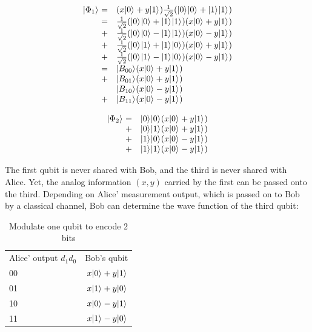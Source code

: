 \documentclass{ctexbook}
\begin{document}
\begin{equation}
\begin{array}{rl}
\vert {\Phi_1} \rangle_{}
    = & (x \vert {0} \rangle_{} + y\vert {1} \rangle_{}) \frac 1 {\sqrt 2}(\vert {0} \rangle_{}\vert {0} \rangle_{}+\vert {1} \rangle_{}\vert {1} \rangle_{}) \\
    = & \frac 1 {\sqrt 2} (\vert {0} \rangle_{}\vert {0} \rangle_{}+\vert {1} \rangle_{}\vert {1} \rangle_{}) (x \vert {0} \rangle_{} + y\vert {1} \rangle_{}) \\
    +& \frac 1 {\sqrt 2} (\vert {0} \rangle_{}\vert {0} \rangle_{}-\vert {1} \rangle_{}\vert {1} \rangle_{}) (x \vert {0} \rangle_{} - y\vert {1} \rangle_{})  \\
    +& \frac 1 {\sqrt 2} (\vert {0} \rangle_{}\vert {1} \rangle_{}+\vert {1} \rangle_{}\vert {0} \rangle_{}) (x \vert {0} \rangle_{} + y\vert {1} \rangle_{}) \\
    +& \frac 1 {\sqrt 2} (\vert {0} \rangle_{}\vert {1} \rangle_{}-\vert {1} \rangle_{}\vert {0} \rangle_{}) (x \vert {0} \rangle_{} - y\vert {1} \rangle_{}) \\
    = & \vert {B_{00}} \rangle_{} (x \vert {0} \rangle_{} + y\vert {1} \rangle_{}) \\
    +& \vert {B_{01}} \rangle_{} (x \vert {0} \rangle_{} + y\vert {1} \rangle_{}) \\
    & \vert {B_{10}} \rangle_{} (x \vert {0} \rangle_{} - y\vert {1} \rangle_{}) \\
    +& \vert {B_{11}} \rangle_{} (x \vert {0} \rangle_{} - y\vert {1} \rangle_{})
\end{array}
\end{equation}

\begin{equation}
\begin{array}{rl}
\vert {\Phi_2} \rangle_{}
    = & \vert {0} \rangle_{} \vert {0} \rangle_{} (x \vert {0} \rangle_{} + y\vert {1} \rangle_{}) \\
    +& \vert {0} \rangle_{} \vert {1} \rangle_{} (x \vert {0} \rangle_{} + y\vert {1} \rangle_{}) \\
    + & \vert {1} \rangle_{} \vert {0} \rangle_{}  (x \vert {0} \rangle_{} - y\vert {1} \rangle_{}) \\
    +& \vert {1} \rangle_{} \vert {1} \rangle_{} (x \vert {0} \rangle_{} - y\vert {1} \rangle_{})
\end{array}
\end{equation}

The first qubit is never shared with Bob, and the third is never shared with Alice. Yet, the analog information $(x, y)$ carried by the first can be passed onto the third. Depending on Alice' measurement output, which is passed on to Bob by a classical channel, Bob can determine the wave function of the third qubit:
\begin{table}[]
\label{TeleportationTable}
\begin{tabular}{lr}
Alice' output $d_1 d_0$ & Bob's qubit  \\
00 & $x\vert {0} \rangle_{}+y\vert {1} \rangle_{}$ \\
01 & $x\vert {1} \rangle_{}+y\vert {0} \rangle_{}$ \\
10 & $x\vert {0} \rangle_{}-y\vert {1} \rangle_{}$  \\
11 & $x\vert {1} \rangle_{}-y\vert {0} \rangle_{}$ 
\end{tabular}
\caption{Modulate one qubit to encode 2 bits}
\end{table}
\end{document}
